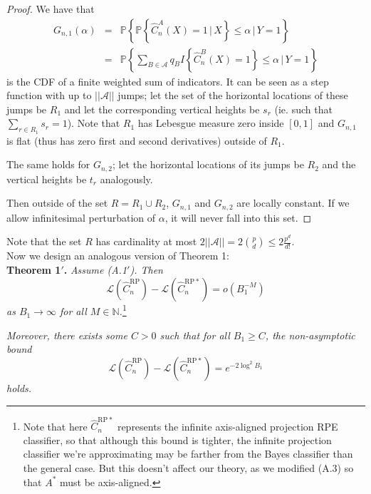 \documentclass{amsart}
\newcommand\crpnhat{\hat{C}_{n}^{\mathrm{RP}}}
\newcommand\crpnhatstar{\hat{C}_{n}^{\mathrm{RP*}}}
\newcommand\risk{\mathcal{L}}
\begin{document}
\begin{proof}
We have that 
\begin{eqnarray*}
G_{n,1}(\alpha) & = & \mathbb{P}\left\{ \mathbb{P}\left\{ \hat{C}_{n}^{A}(X)=1\,\Big|\,X\right\} \leq\alpha\,\Big|\,Y=1\right\} \\
 & = & \mathbb{P}\left\{ \sum_{B\in\mathcal{A}}q_{B}I\left\{ \hat{C}_{n}^{B}(X)=1\right\} \leq\alpha\,\Big|\,Y=1\right\} 
\end{eqnarray*}
 is the CDF of a finite weighted sum of indicators. It can be seen
as a step function with up to $||\mathcal{A}||$ jumps; let the set of the
horizontal locations of these jumps be $R_{1}$ and let the corresponding
vertical heights be $s_{r}$ (ie. such that $\sum_{r\in R_{1}}s_{r}=1$).
Note that $R_{1}$ has Lebesgue measure zero inside $[0,1]$ and $G_{n,1}$
is flat (thus has zero first and second derivatives) outside of $R_{1}$.

The same holds for $G_{n,2}$; let the horizontal locations of its
jumps be $R_{2}$ and the vertical heights be $t_{r}$ analogously.

Then outside of the set $R=R_{1}\cup R_{2}$, $G_{n,1}$ and $G_{n,2}$ are locally constant. If we allow infinitesimal perturbation of $\alpha$, it will never fall into this set.
\end{proof}


Note that the set $R$ has cardinality at most $2||\mathcal{A}||=2\binom{p}{d}\leq2\frac{p^{d}}{d!}$.\\


Now we design an analogous version of Theorem 1:\\


\noindent \textbf{Theorem 1$'$.} \emph{Assume (A.1$'$). Then 
\[
\risk\left(\crpnhat\right)-\risk\left(\crpnhatstar\right)=o\left(B_{1}^{-M}\right)
\]
 as $B_{1}\to\infty$ for all $M\in\mathbb{N}$.}\footnote{\noindent Note that here $\crpnhatstar$ represents the infinite axis-aligned
projection RPE classifier, so that although this bound is tighter,
the infinite projection classifier we're approximating may be farther
from the Bayes classifier than the general case. But this doesn't affect our theory, as
we modified (A.3) so that $A^{*}$ must be axis-aligned.}

\emph{Moreover, there exists some $C>0$ such that for all $B_1\geq C$, the non-asymptotic bound
\[
\risk\left(\crpnhat\right)-\risk\left(\crpnhatstar\right)=e^{-2\log^2 B_1}
\]
holds.}
\end{document}
